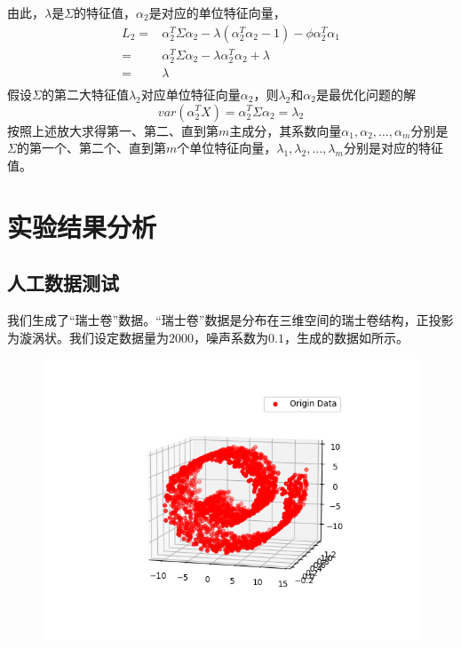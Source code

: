 \documentclass[lang=cn,11pt,a4paper,cite=authoryear]{elegantpaper}
\begin{document}
由此，$\lambda$是$\Sigma$的特征值，$\alpha_2$是对应的单位特征向量，
\begin{equation}
\begin{aligned}
	L_2=&\alpha_2^T\Sigma\alpha_2-\lambda(\alpha_2^T\alpha_2-1)-\phi\alpha_2^T\alpha_1\\
	=&\alpha_2^T\Sigma\alpha_2-\lambda\alpha_2^T\alpha_2+\lambda\\
	=&\lambda\\
\end{aligned}
\end{equation}
假设$\Sigma$的第二大特征值$\lambda_2$对应单位特征向量$\alpha_2$，则$\lambda_2$和$\alpha_2$是最优化问题的解
\begin{equation}
var(\alpha_2^TX)=\alpha_2^T\Sigma\alpha_2=\lambda_2
\end{equation}
按照上述放大求得第一、第二、直到第$m$主成分，其系数向量$\alpha_1,\alpha_2,\dots,\alpha_m$分别是$\Sigma$的第一个、第二个、直到第$m$个单位特征向量，$\lambda_1,\lambda_2,\dots,\lambda_m$分别是对应的特征值。

\section{实验结果分析}

\subsection{人工数据测试}
我们生成了“瑞士卷”数据。“瑞士卷”数据是分布在三维空间的瑞士卷结构，正投影为漩涡状。我们设定数据量为$2000$，噪声系数为$0.1$，生成的数据如所示。

\begin{figure}[H]
	\centering
	\includegraphics[width=0.7\linewidth]{images/ml_lab4_1.png}
	\caption{}
	\label{fig:mllab41}
\end{figure}
\end{document}

